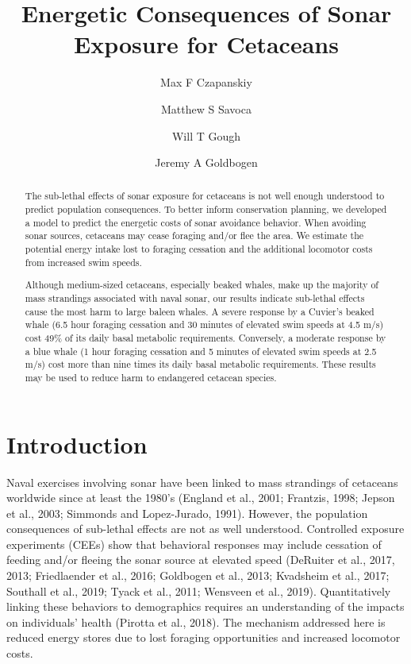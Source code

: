 \documentclass[]{elsarticle} %
\begin{document}
\begin{frontmatter}

  \title{Energetic Consequences of Sonar Exposure for Cetaceans}
    \author[1]{Max F Czapanskiy}
    \author[1]{Matthew S Savoca}
  
  
    \author[1]{Will T Gough}
  
  
    \author[1]{Jeremy A Goldbogen}
  
  
      \address[1]{Department of Biology, Hopkins Marine Station, Stanford University, 120
Ocean View Boulevard, Pacific Grove, CA 93950, USA}
  
  \begin{abstract}
  The sub-lethal effects of sonar exposure for cetaceans is not well
  enough understood to predict population consequences. To better inform
  conservation planning, we developed a model to predict the energetic
  costs of sonar avoidance behavior. When avoiding sonar sources,
  cetaceans may cease foraging and/or flee the area. We estimate the
  potential energy intake lost to foraging cessation and the additional
  locomotor costs from increased swim speeds.
  
  Although medium-sized cetaceans, especially beaked whales, make up the
  majority of mass strandings associated with naval sonar, our results
  indicate sub-lethal effects cause the most harm to large baleen whales.
  A severe response by a Cuvier's beaked whale (6.5 hour foraging
  cessation and 30 minutes of elevated swim speeds at 4.5 m/s) cost 49\%
  of its daily basal metabolic requirements. Conversely, a moderate
  response by a blue whale (1 hour foraging cessation and 5 minutes of
  elevated swim speeds at 2.5 m/s) cost more than nine times its daily
  basal metabolic requirements. These results may be used to reduce harm
  to endangered cetacean species.
  \end{abstract}
  
 \end{frontmatter}

\doublespacing
\linenumbers

\section{Introduction}\label{introduction}

Naval exercises involving sonar have been linked to mass strandings of
cetaceans worldwide since at least the 1980's (England et al., 2001;
Frantzis, 1998; Jepson et al., 2003; Simmonds and Lopez-Jurado, 1991).
However, the population consequences of sub-lethal effects are not as
well understood. Controlled exposure experiments (CEEs) show that
behavioral responses may include cessation of feeding and/or fleeing the
sonar source at elevated speed (DeRuiter et al., 2017, 2013;
Friedlaender et al., 2016; Goldbogen et al., 2013; Kvadsheim et al.,
2017; Southall et al., 2019; Tyack et al., 2011; Wensveen et al., 2019).
Quantitatively linking these behaviors to demographics requires an
understanding of the impacts on individuals' health (Pirotta et al.,
2018). The mechanism addressed here is reduced energy stores due to lost
foraging opportunities and increased locomotor costs.
\end{document}
